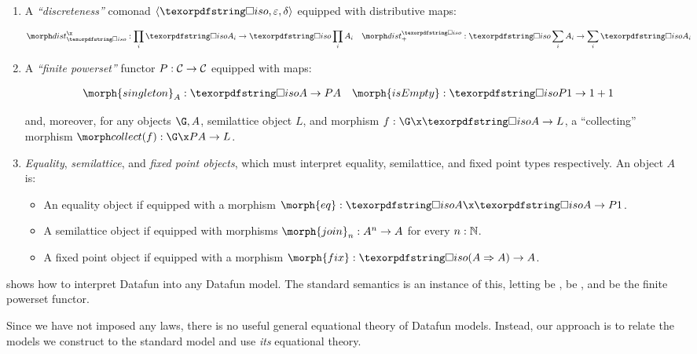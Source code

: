 \documentclass{rntz}\usepackage[a5]{rntzgeometry}\usepackage[fullwidth=130mm,width=330pt,]{narrow}
\begin{document}
\begin{enumerate}
\item A \emph{``discreteness''} comonad $\tuple{\disco{}, \varepsilon, \delta}$
  equipped with distributive maps:

  \nopagebreak[2]
  \begin{align*}
    \discox &: \prod_i \discof{A_i} \to \disco \prod_i A_i
    &
    \discosum &: \disco \sum_i A_i \to \sum_i \discof{A_i}
  \end{align*}

\item A \emph{``finite powerset''} functor \(P : \mathcal{C} \to \mathcal{C}\) equipped
  with maps:

  \nopagebreak[2]
  \begin{align*}
    \morph{singleton}_A &: \isof A \to \pfinof{A} &
    \morph{isEmpty} &: \discof{\pfinof{\termO}} \to \termO + \termO
  \end{align*}

  \noindent
  and, moreover, for any objects $\G,A$, semilattice object $L$, and morphism $f
  : \G \x \isof A \to L$, a ``collecting'' morphism \( \pcollect{f} : \G \x
  \pfinof A \to L \).

\item \emph{Equality}, \emph{semilattice}, and \emph{fixed point objects}, which
  must interpret equality, semilattice, and fixed point types respectively. An
  object $A$ is:
%
  \begin{itemize}
  \item An equality object if equipped with a morphism $\morph{eq} : \discof A
    \x \discof A \to \pfinof \termO$.

  \item A semilattice object if equipped with morphisms $\morph{join}_n : A^n
    \to A$ for every $n : \mathbb{N}$.

  \item A fixed point object if equipped with a morphism $\morph{fix} :
    \discof{(\expO A A)} \to A$.
  \end{itemize}

\end{enumerate}

\noindent
{} shows how to interpret Datafun into any Datafun
model. The standard semantics is an instance of this, letting \catC{} be
\Poset{}, \iso{} be \iso{}, and \pfin{} be the finite powerset functor.

Since we have not imposed any laws, there is no useful general equational theory
of Datafun models. Instead, our approach is to relate the models we construct to
the standard model and use \emph{its} equational theory.
\end{document}
